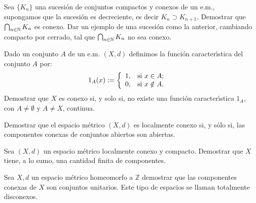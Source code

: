 \begin{ejercicio}{} Sea $\{K_n\}$ una sucesi\'on de conjuntos compactos y conexos
de un e.m., supongamos que la sucesi\'on es decreciente, es decir
$K_n\supset K_{n+1}$. Demostrar que $\bigcap_{n\in\mathbb{N}} K_n$ es
conexo. Dar un ejemplo de una sucesi\'on como la anterior,
cambiando compacto por cerrado, tal que $\bigcap_{n\in\mathbb{N}}K_n$ no
sea conexo.
\end{ejercicio}

\begin{ejercicio}{} Dado un conjunto $A$ de un e.m. $(X,d)$
definimos la funci\'on caracter\'{\i}stica del conjunto $A$ por:
\[
    1_A(x):=\left\{%
\begin{array}{ll}
    1, & \hbox{si $x\in A$;} \\
    0, & \hbox{si $x\notin A$.} \\
\end{array}%
\right.
\]
Demostrar que $X$ es conexo si, y solo si, no existe una funci\'on
caracter\'{\i}stica $1_A$, con $A\neq\emptyset$ y $A\neq X$,
continua.
\end{ejercicio}

 


\begin{ejercicio}{} Demostrar que el espacio métrico $(X,d)$ es
localmente conexo si, y sólo si, las componentes conexas de conjuntos
abiertos son abiertas.
\end{ejercicio}

\begin{ejercicio}{} Sea $(X,d)$ un espacio métrico localmente
conexo y compacto. Demostrar que $X$ tiene, a lo sumo, una
cantidad finita de componentes.
\end{ejercicio}

\begin{ejercicio}{} Sea ${X,d}$ un espacio métrico homeomorfo a
$\mathbb{Z}$ demostrar que las componentes conexas de $X$ son
conjuntos unitarios. Este tipo de espacios se llaman totalmente
disconexos. \end{ejercicio}
